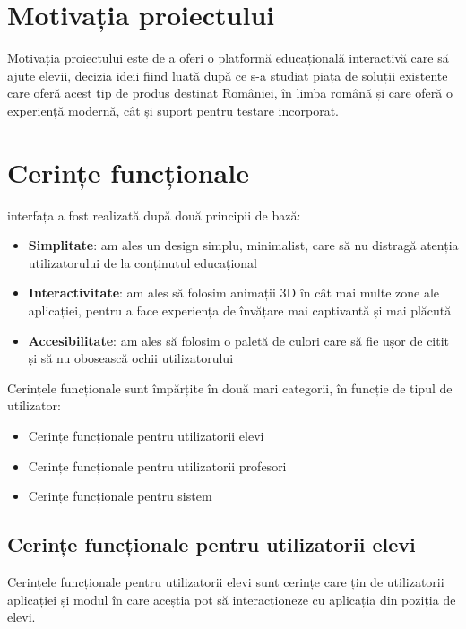 \section{Motivația proiectului}
\label{sec:proj-motivation}

Motivația proiectului este de a oferi o platformă educațională interactivă care să ajute elevii, decizia ideii fiind luată după ce s-a studiat
piața de soluții existente care oferă acest tip de produs destinat României, în limba română și care oferă o experiență modernă, cât și suport pentru 
testare incorporat. 

\section{Cerințe funcționale}
\label{sec:proj-requirements}

interfața a fost realizată după două principii de bază:
\begin{itemize}
    \item \textbf{Simplitate}: am ales un design simplu, minimalist, care să nu distragă atenția utilizatorului de la conținutul educațional
    \item \textbf{Interactivitate}: am ales să folosim animații 3D în cât mai multe zone ale aplicației, pentru a face experiența de învățare mai captivantă și mai plăcută
    \item \textbf{Accesibilitate}: am ales să folosim o paletă de culori care să fie ușor de citit și să nu obosească ochii utilizatorului
\end{itemize}

Cerințele funcționale sunt împărțite în două mari categorii, în funcție de tipul de utilizator:
\begin{itemize}
    \item Cerințe funcționale pentru utilizatorii elevi
    \item Cerințe funcționale pentru utilizatorii profesori
    \item Cerințe funcționale pentru sistem
\end{itemize}

\subsection{Cerințe funcționale pentru utilizatorii elevi}
\label{sub-sec:proj-requirements-students}

Cerințele funcționale pentru utilizatorii elevi sunt cerințe care țin de utilizatorii aplicației și modul în care
aceștia pot să interacționeze cu aplicația din poziția de elevi.

